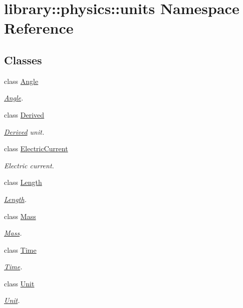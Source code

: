 \hypertarget{namespacelibrary_1_1physics_1_1units}{}\section{library\+:\+:physics\+:\+:units Namespace Reference}
\label{namespacelibrary_1_1physics_1_1units}
\subsection*{Classes}
\begin{DoxyCompactItemize}
\item 
class \hyperlink{classlibrary_1_1physics_1_1units_1_1_angle}{Angle}
\begin{DoxyCompactList}\small\item\em \hyperlink{classlibrary_1_1physics_1_1units_1_1_angle}{Angle}. \end{DoxyCompactList}\item 
class \hyperlink{classlibrary_1_1physics_1_1units_1_1_derived}{Derived}
\begin{DoxyCompactList}\small\item\em \hyperlink{classlibrary_1_1physics_1_1units_1_1_derived}{Derived} unit. \end{DoxyCompactList}\item 
class \hyperlink{classlibrary_1_1physics_1_1units_1_1_electric_current}{Electric\+Current}
\begin{DoxyCompactList}\small\item\em Electric current. \end{DoxyCompactList}\item 
class \hyperlink{classlibrary_1_1physics_1_1units_1_1_length}{Length}
\begin{DoxyCompactList}\small\item\em \hyperlink{classlibrary_1_1physics_1_1units_1_1_length}{Length}. \end{DoxyCompactList}\item 
class \hyperlink{classlibrary_1_1physics_1_1units_1_1_mass}{Mass}
\begin{DoxyCompactList}\small\item\em \hyperlink{classlibrary_1_1physics_1_1units_1_1_mass}{Mass}. \end{DoxyCompactList}\item 
class \hyperlink{classlibrary_1_1physics_1_1units_1_1_time}{Time}
\begin{DoxyCompactList}\small\item\em \hyperlink{classlibrary_1_1physics_1_1units_1_1_time}{Time}. \end{DoxyCompactList}\item 
class \hyperlink{classlibrary_1_1physics_1_1units_1_1_unit}{Unit}
\begin{DoxyCompactList}\small\item\em \hyperlink{classlibrary_1_1physics_1_1units_1_1_unit}{Unit}. \end{DoxyCompactList}\end{DoxyCompactItemize}
